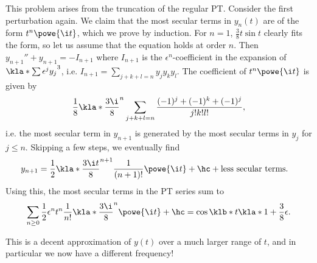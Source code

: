 \documentclass[english, parskip=full]{scrbook}
\newcommand{\note}[1]{\begin{tcolorbox}[colback=colorbackgroundnote,colframe=colornote, breakable,enhanced]#1\end{tcolorbox}}
\begin{document}
This problem arises from the truncation of the regular PT.
Consider the first perturbation again.
We claim that the most secular terms in $y_n(t)$ are of the form $t^n \powe{\i t}$, which we prove by induction.
For $n=1$, $\frac{3}{8} t\sin t$ clearly fits the form, so let us assume that the equation holds at order $n$.
Then $y_{n+1}''+y_{n+1}=-I_{n+1}$ where $I_{n+1}$ is the $\epsilon^n$-coefficient in the expansion of $\kla*{\sum \epsilon^j y_j}^3$, i.e. $I_{n+1} = \sum_{j+k+l=n} y_jy_ky_l$.
The coefficient of $t^n\powe{\i t}$ is given by
\begin{align}
\frac{1}{8} \kla*{\frac{3\i}{8}}^n \sum_{j+k+l=n} \frac{(-1)^j + (-1)^k + (-1)^j}{j!k!l!},
\end{align}
i.e. the most secular term in $y_{n+1}$ is generated by the most secular terms in $y_j$ for $j\le n$.
Skipping a few steps, we eventually find
\begin{align}
y_{n+1} &= \frac{1}{2} \kla*{\frac{3\i t}{8}}^{n+1} \frac{1}{(n+1)!} \powe{\i t} + \hc + \text{less secular terms}.
\end{align}
Using this, the most secular terms in the PT series sum to
\begin{align}
\sum_{n\ge 0} \frac{1}{2} \epsilon^n t^n \frac{1}{n!} \kla*{\frac{3\i}{8}}^n \powe{\i t} + \hc = \cos\klb*{t \kla*{1 + \frac{3}{8}\epsilon}}.
\end{align}
\note{
This is a decent approximation of $y(t)$ over a much larger range of $t$, and in particular we now have a different frequency!
}
\end{document}
